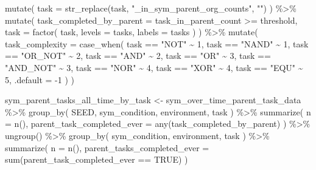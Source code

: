 \documentclass[
]{book}
\newenvironment{Shaded}{\begin{snugshade}}{\end{snugshade}}
\newcommand{\AttributeTok}[1]{\textcolor[rgb]{0.77,0.63,0.00}{#1}}
\newcommand{\ConstantTok}[1]{\textcolor[rgb]{0.00,0.00,0.00}{#1}}
\newcommand{\DecValTok}[1]{\textcolor[rgb]{0.00,0.00,0.81}{#1}}
\newcommand{\FunctionTok}[1]{\textcolor[rgb]{0.00,0.00,0.00}{#1}}
\newcommand{\NormalTok}[1]{#1}
\newcommand{\OtherTok}[1]{\textcolor[rgb]{0.56,0.35,0.01}{#1}}
\newcommand{\SpecialCharTok}[1]{\textcolor[rgb]{0.00,0.00,0.00}{#1}}
\newcommand{\StringTok}[1]{\textcolor[rgb]{0.31,0.60,0.02}{#1}}
\begin{document}
\begin{Shaded}
\begin{Highlighting}[]
  \FunctionTok{mutate}\NormalTok{(}
    \AttributeTok{task =} \FunctionTok{str\_replace}\NormalTok{(task, }\StringTok{"\_in\_sym\_parent\_org\_counts"}\NormalTok{, }\StringTok{""}\NormalTok{)}
\NormalTok{  ) }\SpecialCharTok{\%\textgreater{}\%}
  \FunctionTok{mutate}\NormalTok{(}
    \AttributeTok{task\_completed\_by\_parent =}\NormalTok{ task\_in\_parent\_count }\SpecialCharTok{\textgreater{}=}\NormalTok{ threshold,}
    \AttributeTok{task =} \FunctionTok{factor}\NormalTok{(}
\NormalTok{      task,}
      \AttributeTok{levels =}\NormalTok{ tasks,}
      \AttributeTok{labels =}\NormalTok{ tasks}
\NormalTok{    )}
\NormalTok{  ) }\SpecialCharTok{\%\textgreater{}\%}
  \FunctionTok{mutate}\NormalTok{(}
    \AttributeTok{task\_complexity =} \FunctionTok{case\_when}\NormalTok{(}
\NormalTok{      task }\SpecialCharTok{==} \StringTok{"NOT"} \SpecialCharTok{\textasciitilde{}} \DecValTok{1}\NormalTok{,}
\NormalTok{      task }\SpecialCharTok{==} \StringTok{"NAND"} \SpecialCharTok{\textasciitilde{}} \DecValTok{1}\NormalTok{,}
\NormalTok{      task }\SpecialCharTok{==} \StringTok{"OR\_NOT"} \SpecialCharTok{\textasciitilde{}} \DecValTok{2}\NormalTok{,}
\NormalTok{      task }\SpecialCharTok{==} \StringTok{"AND"} \SpecialCharTok{\textasciitilde{}} \DecValTok{2}\NormalTok{,}
\NormalTok{      task }\SpecialCharTok{==} \StringTok{"OR"} \SpecialCharTok{\textasciitilde{}} \DecValTok{3}\NormalTok{,}
\NormalTok{      task }\SpecialCharTok{==} \StringTok{"AND\_NOT"} \SpecialCharTok{\textasciitilde{}} \DecValTok{3}\NormalTok{,}
\NormalTok{      task }\SpecialCharTok{==} \StringTok{"NOR"} \SpecialCharTok{\textasciitilde{}} \DecValTok{4}\NormalTok{,}
\NormalTok{      task }\SpecialCharTok{==} \StringTok{"XOR"} \SpecialCharTok{\textasciitilde{}} \DecValTok{4}\NormalTok{,}
\NormalTok{      task }\SpecialCharTok{==} \StringTok{"EQU"} \SpecialCharTok{\textasciitilde{}} \DecValTok{5}\NormalTok{,}
      \AttributeTok{.default =} \SpecialCharTok{{-}}\DecValTok{1}
\NormalTok{    )}
\NormalTok{  )}

\NormalTok{sym\_parent\_tasks\_all\_time\_by\_task }\OtherTok{\textless{}{-}}\NormalTok{ sym\_over\_time\_parent\_task\_data }\SpecialCharTok{\%\textgreater{}\%}
  \FunctionTok{group\_by}\NormalTok{(}
\NormalTok{    SEED,}
\NormalTok{    sym\_condition,}
\NormalTok{    environment,}
\NormalTok{    task}
\NormalTok{  ) }\SpecialCharTok{\%\textgreater{}\%}
  \FunctionTok{summarize}\NormalTok{(}
    \AttributeTok{n =} \FunctionTok{n}\NormalTok{(),}
    \AttributeTok{parent\_task\_completed\_ever =} \FunctionTok{any}\NormalTok{(task\_completed\_by\_parent)}
\NormalTok{  ) }\SpecialCharTok{\%\textgreater{}\%}
  \FunctionTok{ungroup}\NormalTok{() }\SpecialCharTok{\%\textgreater{}\%}
  \FunctionTok{group\_by}\NormalTok{(}
\NormalTok{    sym\_condition,}
\NormalTok{    environment,}
\NormalTok{    task}
\NormalTok{  ) }\SpecialCharTok{\%\textgreater{}\%}
  \FunctionTok{summarize}\NormalTok{(}
    \AttributeTok{n =} \FunctionTok{n}\NormalTok{(),}
    \AttributeTok{parent\_tasks\_completed\_ever =} \FunctionTok{sum}\NormalTok{(parent\_task\_completed\_ever }\SpecialCharTok{==} \ConstantTok{TRUE}\NormalTok{)}
\NormalTok{  )}
\end{Highlighting}
\end{Shaded}
\end{document}
